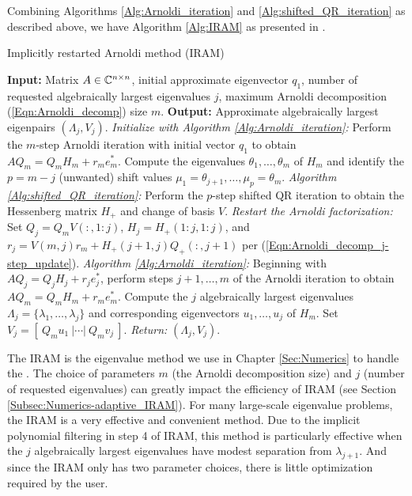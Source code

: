 Combining Algorithms \ref{Alg:Arnoldi_iteration} and \ref{Alg:shifted_QR_iteration} as described above, we have Algorithm \ref{Alg:IRAM} as presented in \cite[Section 10.5.3]{golub2012matrix}.

\begin{algorithm}[H]
\caption{Implicitly restarted Arnoldi method (IRAM)}	\label{Alg:IRAM}

\begin{algorithmic}[1]
	\Statex 	\textbf{Input:} Matrix $A \in {\mathbb C}^{n \times n}$, initial approximate eigenvector $q_1$, number of requested algebraically largest eigenvalues $j$, maximum Arnoldi decomposition (\ref{Eqn:Arnoldi_decomp}) size $m$.
	\Statex 	\textbf{Output:} Approximate algebraically largest eigenpairs $(\Lambda_j, V_j)$.
	\State		\textit{Initialize with Algorithm \ref{Alg:Arnoldi_iteration}:} Perform the $m$-step Arnoldi iteration with initial vector $q_1$ to obtain $AQ_m = Q_m H_m + r_m e_m^*$.
		\State		Compute the eigenvalues $\theta_1, \ldots , \theta_m$ of $H_m$ and identify the $p = m-j$ (unwanted) shift values $\mu_1 = \theta_{j+1},  \ldots, \mu_p = \theta_m$.
		\State		\textit{Algorithm \ref{Alg:shifted_QR_iteration}:}  Perform the $p$-step shifted QR iteration to obtain the Hessenberg matrix $H_+$ and change of basis $V$.
		\State		\textit{Restart the Arnoldi factorization:} Set 
		$Q_j = Q_mV(:, 1:j)$,
		$H_j = H_+(1:j, 1:j)$,
		and $r_j = V(m,j)r_m + H_+(j+1,j)Q_+(:,j+1)$ per (\ref{Eqn:Arnoldi_decomp_j-step_update}).
		\State		\textit{Algorithm \ref{Alg:Arnoldi_iteration}:}  Beginning with $AQ_j = Q_jH_j + r_je_j^*$, perform steps $j+1, \ldots, m$ of the Arnoldi iteration to obtain $AQ_m = Q_m H_m + r_m e_m^*$.
	\EndWhile
	\State 		Compute the $j$ algebraically largest eigenvalues $\Lambda_j = \{ \lambda_1, \ldots, \lambda_j\}$ and corresponding eigenvectors $u_1, \ldots, u_j$ of $H_m$.  Set $V_j = [ \ Q_m u_1 \ | \cdots | \ Q_m v_j \ ]$.
	\State		\textit{Return:} $(\Lambda_j, V_j)$.
\end{algorithmic}

\end{algorithm}


The IRAM is the eigenvalue method we use in Chapter \ref{Sec:Numerics} to handle the \emep.  The choice of parameters $m$ (the Arnoldi decomposition size) and $j$ (number of requested eigenvalues) can greatly impact the efficiency of IRAM (see Section \ref{Subsec:Numerics-adaptive_IRAM}).  For many large-scale eigenvalue problems, the IRAM is a very effective and convenient method.  Due to the implicit polynomial filtering in step 4 of IRAM, this method is particularly effective when the $j$ algebraically largest eigenvalues have modest separation from $\lambda_{j+1}$.  And since the IRAM only has two parameter choices, there is little optimization required by the user.

